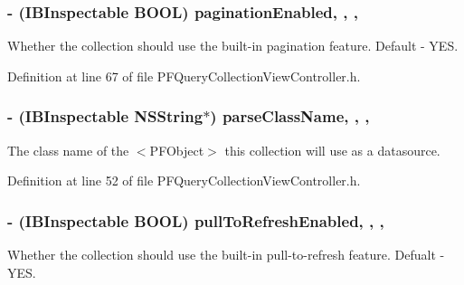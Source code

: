 \subsubsection[{pagination\+Enabled}]{\setlength{\rightskip}{0pt plus 5cm}-\/ (I\+B\+Inspectable B\+O\+O\+L) pagination\+Enabled\hspace{0.3cm}{\ttfamily [read]}, {\ttfamily [write]}, {\ttfamily [nonatomic]}, {\ttfamily [assign]}}\label{interface_p_f_query_collection_view_controller_a28c0a0d62e1c36a171f19dac89b5fe82}
Whether the collection should use the built-\/in pagination feature. Default -\/ {\ttfamily Y\+E\+S}. 

Definition at line 67 of file P\+F\+Query\+Collection\+View\+Controller.\+h.

\hypertarget{interface_p_f_query_collection_view_controller_a78ef068278e2ba0354358f7c68155547}{}
\subsubsection[{parse\+Class\+Name}]{\setlength{\rightskip}{0pt plus 5cm}-\/ (I\+B\+Inspectable N\+S\+String$\ast$) parse\+Class\+Name\hspace{0.3cm}{\ttfamily [read]}, {\ttfamily [write]}, {\ttfamily [nonatomic]}, {\ttfamily [copy]}}\label{interface_p_f_query_collection_view_controller_a78ef068278e2ba0354358f7c68155547}
The class name of the $<$\+P\+F\+Object$>$ this collection will use as a datasource. 

Definition at line 52 of file P\+F\+Query\+Collection\+View\+Controller.\+h.

\hypertarget{interface_p_f_query_collection_view_controller_ac90e0f5906f3e8cc93f2221b71b4ea4c}{}
\subsubsection[{pull\+To\+Refresh\+Enabled}]{\setlength{\rightskip}{0pt plus 5cm}-\/ (I\+B\+Inspectable B\+O\+O\+L) pull\+To\+Refresh\+Enabled\hspace{0.3cm}{\ttfamily [read]}, {\ttfamily [write]}, {\ttfamily [nonatomic]}, {\ttfamily [assign]}}\label{interface_p_f_query_collection_view_controller_ac90e0f5906f3e8cc93f2221b71b4ea4c}
Whether the collection should use the built-\/in pull-\/to-\/refresh feature. Defualt -\/ {\ttfamily Y\+E\+S}. 

